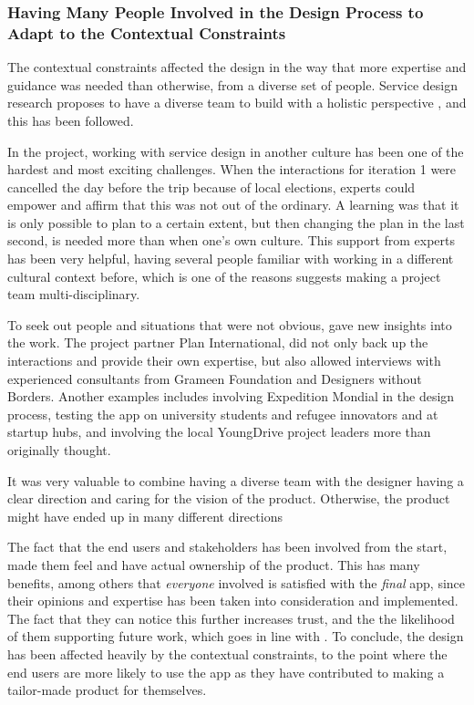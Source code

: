   \subsubsection{Having Many People Involved in the Design Process to Adapt to the Contextual Constraints}

  The contextual constraints affected the design in the way that more expertise and guidance was needed than otherwise, from a diverse set of people. Service design research proposes to have a diverse team to build with a holistic perspective \citep{stickdorn}, and this has been followed.

  In the project, working with service design in another culture has been one of the hardest and most exciting challenges. When the interactions for iteration 1 were cancelled the day before the trip because of local elections, experts could empower and affirm that this was not out of the ordinary. A learning was that it is only possible to plan to a certain extent, but then changing the plan in the last second, is needed more than when one's own culture. This support from experts has been very helpful, having several people familiar with working in a different cultural context before, which is one of the reasons \cite{stickdorn} suggests making a project team multi-disciplinary. %

  To seek out people and situations that were not obvious, gave new insights into the work.  The project partner Plan International, did not only back up the interactions and provide their own expertise, but also allowed interviews with experienced consultants from Grameen Foundation and Designers without Borders. Another examples includes involving Expedition Mondial in the design process, testing the app on university students and refugee innovators and at startup hubs, and involving the local YoungDrive project leaders more than originally thought.

  It was very valuable to combine having a diverse team with the designer having a clear direction and caring for the vision of the product. Otherwise, the product might have ended up in many different directions

  The fact that the end users and stakeholders has been involved from the start, made them feel and have actual ownership of the product. This has many benefits, among others that \textit{everyone} involved is satisfied with the \textit{final} app, since their opinions and expertise has been taken into consideration and implemented. The fact that they can notice this further increases trust, and the the likelihood of them supporting future work, which goes in line with \cite{stickdorn}. To conclude, the design has been affected heavily by the contextual constraints, to the point where the end users are more likely to use the app as they have contributed to making a tailor-made product for themselves.

